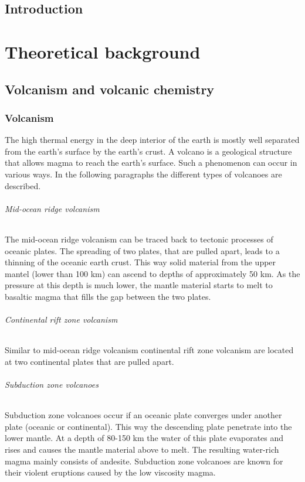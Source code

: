 \documentclass  [
  paper    = a4,
  BCOR     = 10mm,
  twoside,
  fontsize = 12pt,
  fleqn,
  toc      = bibnumbered,
  toc      = listofnumbered,
  numbers  = noendperiod,
  headings = normal,
  listof   = leveldown,
  version  = 3.03
]                                       {scrreprt}
\begin{document}
  

  \tableofcontents
	\chapter{Introduction}	
	
    \part{Theoretical background}
\chapter{Volcanism and volcanic chemistry}

\section{Volcanism}
The high thermal energy in the deep interior of the earth is mostly well separated from the earth’s surface by the earth’s crust. A volcano is a geological structure that allows magma to reach the earth’s surface. Such a phenomenon can occur in various ways. In the following paragraphs the different types of volcanoes are described.
\paragraph{ Mid-ocean ridge volcanism}
The mid-ocean ridge volcanism can be traced back to tectonic processes of oceanic plates. The spreading of two plates, that are pulled apart, leads to a thinning of the oceanic earth crust. This way solid material from the upper mantel (lower than 100 km) can ascend to depths of approximately 50 km. As the pressure at this depth is much lower, the mantle material starts to melt to basaltic magma that fills the gap between the two plates.
\paragraph{ Continental rift zone volcanism}
Similar to mid-ocean ridge volcanism continental rift zone volcanism are located at two continental plates that are pulled apart.
\paragraph{ Subduction zone volcanoes}
Subduction zone volcanoes occur if an oceanic plate converges under another plate (oceanic or continental). This way the descending plate penetrate into the lower mantle. At a depth of 80-150 km the water of this plate evaporates and rises and causes the mantle material above to melt. The resulting water-rich magma mainly consists of andesite. Subduction zone volcanoes are known for their violent eruptions caused by the low viscosity magma.
\end{document}
